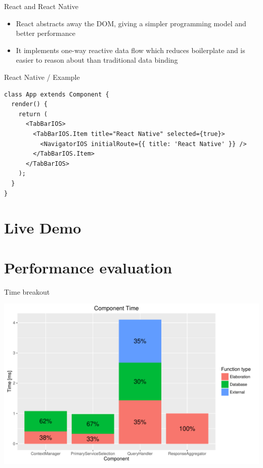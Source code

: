 \documentclass[smaller]{beamer}
\begin{document}
\begin{frame}[label={sec:orgheadline21}]{React and React Native}
\begin{itemize}
\item React abstracts away the DOM, giving a simpler programming model and better performance

\item It implements one-way reactive data flow which reduces boilerplate and is easier to reason about than traditional data binding
\end{itemize}
\end{frame}

\begin{frame}[fragile,label={sec:orgheadline22}]{React Native / Example}
 \begin{verbatim}
class App extends Component {
  render() {
    return (
      <TabBarIOS>
        <TabBarIOS.Item title="React Native" selected={true}>
          <NavigatorIOS initialRoute={{ title: 'React Native' }} />
        </TabBarIOS.Item>
      </TabBarIOS>
    );
  }
}
\end{verbatim}
\end{frame}


\section{Live Demo}
\label{sec:orgheadline24}

\section{Performance evaluation}
\label{sec:orgheadline27}
\begin{frame}[label={sec:orgheadline25}]{Time breakout}
\begin{center}
\includegraphics[width=.9\linewidth]{./images/component_time.pdf}
\end{center}
\end{frame}
\end{document}
